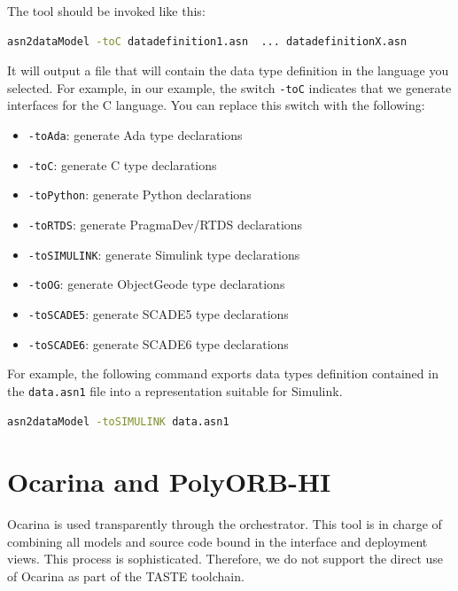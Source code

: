 \documentclass[11pt]{book}
\begin{document}
      The tool should be invoked like this:

      \begin{lstlisting}[language=bash]
asn2dataModel -toC datadefinition1.asn  ... datadefinitionX.asn 
      \end{lstlisting}

      It will output a file that will contain the data type definition in the
      language you selected. For example, in our example, the switch
      \texttt{-toC} indicates that we generate interfaces for the C language.
      You can replace this switch with the following:
      \begin{itemize}
         \item
            \texttt{-toAda}: generate Ada type declarations
         \item
            \texttt{-toC}: generate C type declarations
         \item
            \texttt{-toPython}: generate Python declarations
         \item
            \texttt{-toRTDS}: generate PragmaDev/RTDS declarations
         \item
            \texttt{-toSIMULINK}: generate Simulink type declarations
         \item
            \texttt{-toOG}: generate ObjectGeode type declarations
         \item
            \texttt{-toSCADE5}: generate SCADE5 type declarations
         \item
            \texttt{-toSCADE6}: generate SCADE6 type declarations
      \end{itemize}

      For example, the following command exports data types definition contained
      in the \texttt{data.asn1} file into a representation suitable for
      Simulink.

      \begin{lstlisting}[language=bash]
asn2dataModel -toSIMULINK data.asn1
      \end{lstlisting}


\section{Ocarina and PolyORB-HI}

Ocarina is used transparently through the orchestrator. This tool is
in charge of combining all models and source code bound in the
interface and deployment views. This process is sophisticated. Therefore, 
we do not support the direct use of Ocarina as part of the TASTE toolchain.
\end{document}
